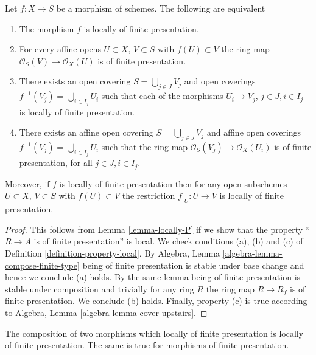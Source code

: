\begin{lemma}
\label{lemma-locally-finite-presentation-characterize}
Let $f : X \to S$ be a morphism of schemes.
The following are equivalent
\begin{enumerate}
\item The morphism $f$ is locally of finite presentation.
\item For every affine opens $U \subset X$, $V \subset S$
with $f(U) \subset V$ the ring map
$\mathcal{O}_S(V) \to \mathcal{O}_X(U)$ is of finite presentation.
\item There exists an open covering $S = \bigcup_{j \in J} V_j$
and open coverings $f^{-1}(V_j) = \bigcup_{i \in I_j} U_i$ such
that each of the morphisms $U_i \to V_j$, $j\in J, i\in I_j$
is locally of finite presentation.
\item There exists an affine open covering $S = \bigcup_{j \in J} V_j$
and affine open coverings $f^{-1}(V_j) = \bigcup_{i \in I_j} U_i$ such
that the ring map $\mathcal{O}_S(V_j) \to \mathcal{O}_X(U_i)$ is
of finite presentation, for all $j\in J, i\in I_j$.
\end{enumerate}
Moreover, if $f$ is locally of finite presentation then for
any open subschemes $U \subset X$, $V \subset S$ with $f(U) \subset V$
the restriction $f|_U : U \to V$ is locally of finite presentation.
\end{lemma}

\begin{proof}
This follows from Lemma \ref{lemma-locally-P} if we show that
the property ``$R \to A$ is of finite presentation'' is local.
We check conditions (a), (b) and (c) of Definition
\ref{definition-property-local}.
By Algebra, Lemma \ref{algebra-lemma-compose-finite-type}
being of finite presentation is stable under base change and hence
we conclude (a) holds. By the same lemma being of finite presentation
is stable under composition and trivially for any ring
$R$ the ring map $R \to R_f$ is of finite presentation.
We conclude (b) holds. Finally, property (c) is true
according to Algebra, Lemma \ref{algebra-lemma-cover-upstairs}.
\end{proof}

\begin{lemma}
\label{lemma-composition-finite-presentation}
The composition of two morphisms which locally of finite presentation is
locally of finite presentation.
The same is true for morphisms of finite presentation.
\end{lemma}

